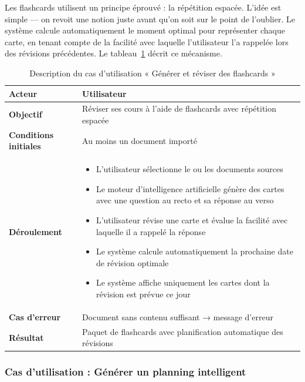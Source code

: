 Les flashcards utilisent un principe éprouvé : la répétition espacée. L'idée est simple — on revoit une notion juste avant qu'on soit sur le point de l'oublier. Le système calcule automatiquement le moment optimal pour représenter chaque carte, en tenant compte de la facilité avec laquelle l'utilisateur l'a rappelée lors des révisions précédentes. Le tableau~\ref{tab:uc_flashcard} décrit ce mécanisme.

\begin{table}[H]
\centering
\renewcommand{\arraystretch}{1.2}
\begin{tabular}{|p{4cm}|p{10cm}|}
\hline
\textbf{Acteur} & Utilisateur \\ \hline
\textbf{Objectif} & Réviser ses cours à l'aide de flashcards avec répétition
                    espacée \\ \hline
\textbf{Conditions initiales} & Au moins un document importé \\ \hline
\textbf{Déroulement} &
\begin{itemize}
    \item L'utilisateur sélectionne le ou les documents sources
    \item Le moteur d'intelligence artificielle génère des cartes avec une question au recto et sa réponse au verso
    \item L'utilisateur révise une carte et évalue la facilité avec laquelle il a rappelé la réponse
    \item Le système calcule automatiquement la prochaine date de révision optimale
    \item Le système affiche uniquement les cartes dont la révision est prévue ce jour
\end{itemize} \\ \hline
\textbf{Cas d'erreur} & Document sans contenu suffisant →
                        message d'erreur \\ \hline
\textbf{Résultat} & Paquet de flashcards avec planification automatique
                    des révisions \\ \hline
\end{tabular}
\caption{Description du cas d'utilisation « Générer et réviser des flashcards »}
\label{tab:uc_flashcard}
\end{table}

\subsubsection{Cas d'utilisation : Générer un planning intelligent}

